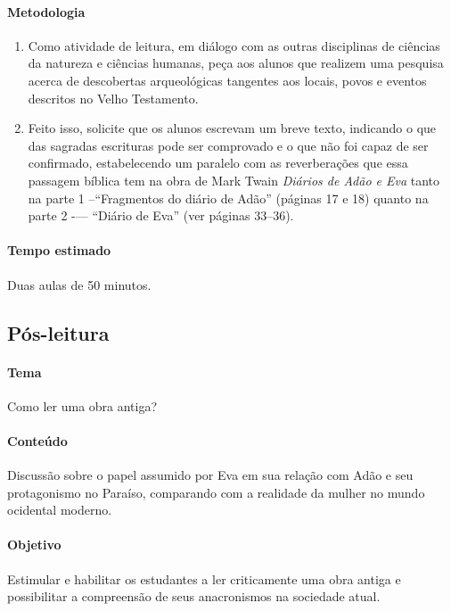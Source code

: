 \documentclass[12pt]{extarticle}
\begin{document}
\paragraph{Metodologia}

\begin{enumerate}
\item
Como atividade de leitura, em diálogo com as outras disciplinas de ciências da natureza e 
ciências humanas, peça aos alunos que realizem uma pesquisa acerca de descobertas 
arqueológicas tangentes aos locais, povos e eventos descritos no Velho Testamento. 

\item
Feito isso, solicite que os alunos escrevam um breve texto, indicando o que 
das sagradas escrituras pode ser comprovado e o que não foi capaz de ser confirmado, 
estabelecendo um paralelo com as reverberações que essa passagem bíblica tem na obra 
de Mark Twain \emph{Diários de Adão e Eva} tanto na parte 1 --``Fragmentos do diário de Adão'' (páginas 17 e 18)
quanto na parte 2 -— ``Diário de Eva'' (ver páginas 33--36).

\end{enumerate}

\paragraph{Tempo estimado} Duas aulas de 50 minutos. 


\subsection{Pós-leitura}

\paragraph{Tema} Como ler uma obra antiga? 

\paragraph{Conteúdo} Discussão sobre o papel assumido por Eva em sua relação com Adão e seu 
protagonismo no Paraíso, comparando com a realidade da mulher no mundo ocidental moderno.

\paragraph{Objetivo} Estimular e habilitar os estudantes a ler criticamente uma obra 
antiga e possibilitar a compreensão de seus anacronismos na sociedade atual. 
\end{document}
